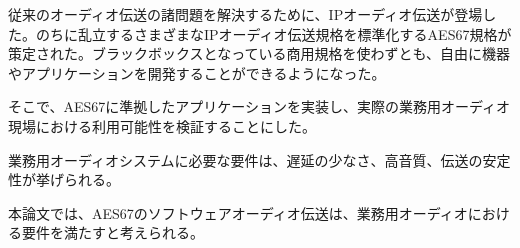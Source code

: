 \begin{jabstract}
  従来のオーディオ伝送の諸問題を解決するために、IPオーディオ伝送が登場した。のちに乱立するさまざまなIPオーディオ伝送規格を標準化するAES67規格が策定された。ブラックボックスとなっている商用規格を使わずとも、自由に機器やアプリケーションを開発することができるようになった。

  そこで、AES67に準拠したアプリケーションを実装し、実際の業務用オーディオ現場における利用可能性を検証することにした。

  業務用オーディオシステムに必要な要件は、遅延の少なさ、高音質、伝送の安定性が挙げられる。

  本論文では、AES67のソフトウェアオーディオ伝送は、業務用オーディオにおける要件を満たすと考えられる。
\end{jabstract}
